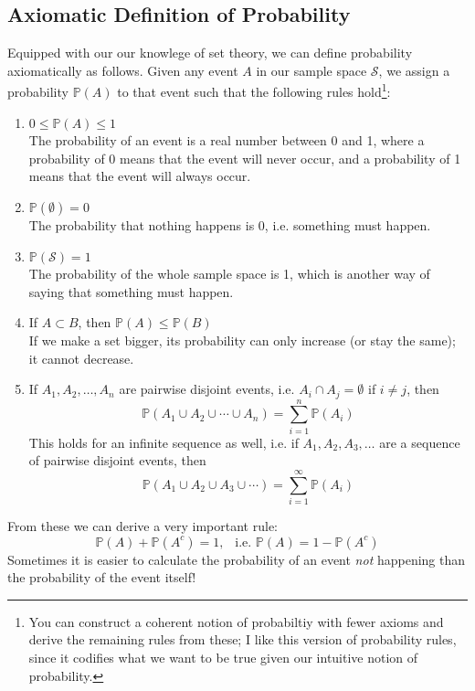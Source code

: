 \documentclass[12pt]{article}
\theoremstyle{definition}
\theoremstyle{remark}
\def\P{{\mathbb P}}
\def\cals{{\mathcal S}}
\begin{document}
\subsection{Axiomatic Definition of Probability}
Equipped with our our knowlege of set theory, we can define probability axiomatically as follows. Given any event $A$ in our sample space $\cals$, we assign a probability $\P(A)$ to that event such that the following rules hold\footnote{You can construct a coherent notion of probabiltiy with fewer axioms and derive the remaining rules from these; I like this version of probability rules, since it codifies what we want to be true given our intuitive notion of probability.}:
\begin{enumerate}
\item $0 \leq \P(A) \leq 1$ \\

The probability of an event is a real number between 0 and 1, where a probability of 0 means that the event will never occur, and a probability of 1 means that the event will always occur.
\item $\P(\emptyset) = 0$ \\

The probability that nothing happens is 0, i.e. something must happen.
\item $\P(\cals) = 1$ \\

The probability of the whole sample space is 1, which is another way of saying that something must happen.
\item If $A \subset B$, then $\P(A) \leq \P(B)$ \\

If we make a set bigger, its probability can only increase (or stay the same); it cannot decrease.

\item If $A_1, A_2, \dots, A_n$ are pairwise disjoint events, i.e. $A_i \cap A_j = \emptyset$ if $i \neq j$, then
\[
\P(A_1 \cup A_2 \cup \cdots \cup A_n) = \sum_{i=1}^n \P(A_i)
\]
This holds for an infinite sequence as well, i.e. if $A_1, A_2, A_3, \dots$ are a sequence of pairwise disjoint events, then 
\[
\P(A_1 \cup A_2 \cup A_3 \cup \cdots) = \sum_{i=1}^\infty \P(A_i)
\]
\end{enumerate}

From these we can derive a very important rule:
\[
\P(A) + \P(A^c) = 1, \:\:\text{ i.e. }\P(A) = 1 - \P(A^c)
\]
Sometimes it is easier to calculate the probability of an event \emph{not} happening than the probability of the event itself!\\
\end{document}
